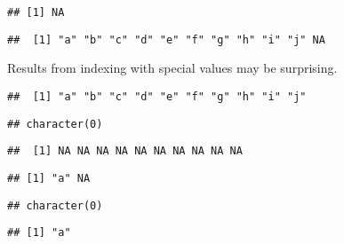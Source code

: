 \documentclass[paper=a4,headsepline,BCOR=12mm,twoside,open=right,%
titlepage,headings=small,fontsize=10pt,index=totoc,bibliography=totoc,%
captions=tableheading,captions=nooneline]{scrbook}\usepackage{knitr}
\begin{document}
\begin{knitrout}\footnotesize
{}\color{fgcolor}\begin{kframe}
\begin{alltt}
\hlstd{a[}\hlstd{]}
\end{alltt}
\begin{verbatim}
## [1] NA
\end{verbatim}
\begin{alltt}
\hlstd{a[}\hlopt{:}\hlstd{]}
\end{alltt}
\begin{verbatim}
##  [1] "a" "b" "c" "d" "e" "f" "g" "h" "i" "j" NA
\end{verbatim}
\end{kframe}
\end{knitrout}

Results from indexing with special values may be surprising.

\begin{knitrout}\footnotesize
{}\color{fgcolor}\begin{kframe}
\begin{alltt}
\end{alltt}
\begin{verbatim}
##  [1] "a" "b" "c" "d" "e" "f" "g" "h" "i" "j"
\end{verbatim}
\begin{alltt}
\hlstd{a[}\hlstd{(}\hlstd{)]}
\end{alltt}
\begin{verbatim}
## character(0)
\end{verbatim}
\begin{alltt}
\hlstd{a[}\hlstd{]}
\end{alltt}
\begin{verbatim}
##  [1] NA NA NA NA NA NA NA NA NA NA
\end{verbatim}
\begin{alltt}
\hlstd{a[}\hlstd{(}\hlstd{,} \hlstd{)]}
\end{alltt}
\begin{verbatim}
## [1] "a" NA
\end{verbatim}
\begin{alltt}
\hlstd{a[}\hlstd{]}
\end{alltt}
\begin{verbatim}
## character(0)
\end{verbatim}
\begin{alltt}
\hlstd{a[}\hlstd{(}\hlstd{,} \hlstd{)]}
\end{alltt}
\begin{verbatim}
## [1] "a"
\end{verbatim}
\end{kframe}
\end{knitrout}
\end{document}
